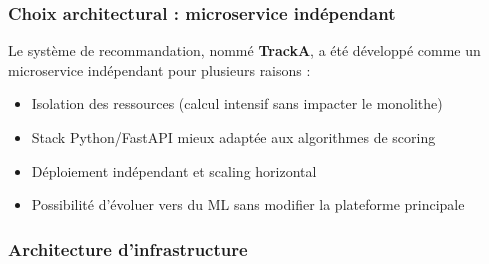 \documentclass[12pt,a4paper,openany]{report}
\begin{document}
\subsubsection{Choix architectural : microservice indépendant}

Le système de recommandation, nommé \textbf{TrackA}, a été développé comme un microservice indépendant pour plusieurs raisons :
\begin{itemize}
  \item Isolation des ressources (calcul intensif sans impacter le monolithe)
  \item Stack Python/FastAPI mieux adaptée aux algorithmes de scoring
  \item Déploiement indépendant et scaling horizontal
  \item Possibilité d'évoluer vers du ML sans modifier la plateforme principale
\end{itemize}

\subsubsection{Architecture d'infrastructure}
\end{document}
